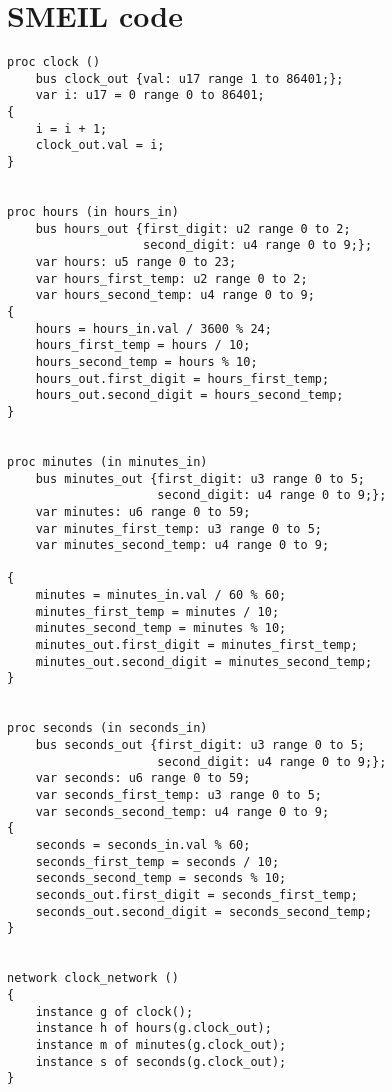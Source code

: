 \section*{SMEIL code}
\begin{verbatim}
proc clock ()
    bus clock_out {val: u17 range 1 to 86401;};
    var i: u17 = 0 range 0 to 86401;
{
    i = i + 1;
    clock_out.val = i;
}


proc hours (in hours_in)
    bus hours_out {first_digit: u2 range 0 to 2;
                   second_digit: u4 range 0 to 9;};
    var hours: u5 range 0 to 23;
    var hours_first_temp: u2 range 0 to 2;
    var hours_second_temp: u4 range 0 to 9;
{
    hours = hours_in.val / 3600 % 24;
    hours_first_temp = hours / 10;
    hours_second_temp = hours % 10;
    hours_out.first_digit = hours_first_temp;
    hours_out.second_digit = hours_second_temp;
}


proc minutes (in minutes_in)
    bus minutes_out {first_digit: u3 range 0 to 5;
                     second_digit: u4 range 0 to 9;};
    var minutes: u6 range 0 to 59;
    var minutes_first_temp: u3 range 0 to 5;
    var minutes_second_temp: u4 range 0 to 9;

{
    minutes = minutes_in.val / 60 % 60;
    minutes_first_temp = minutes / 10;
    minutes_second_temp = minutes % 10;
    minutes_out.first_digit = minutes_first_temp;
    minutes_out.second_digit = minutes_second_temp;
}


proc seconds (in seconds_in)
    bus seconds_out {first_digit: u3 range 0 to 5;
                     second_digit: u4 range 0 to 9;};
    var seconds: u6 range 0 to 59;
    var seconds_first_temp: u3 range 0 to 5;
    var seconds_second_temp: u4 range 0 to 9;
{
    seconds = seconds_in.val % 60;
    seconds_first_temp = seconds / 10;
    seconds_second_temp = seconds % 10;
    seconds_out.first_digit = seconds_first_temp;
    seconds_out.second_digit = seconds_second_temp;
}


network clock_network ()
{
    instance g of clock();
    instance h of hours(g.clock_out);
    instance m of minutes(g.clock_out);
    instance s of seconds(g.clock_out);
}

\end{verbatim}

